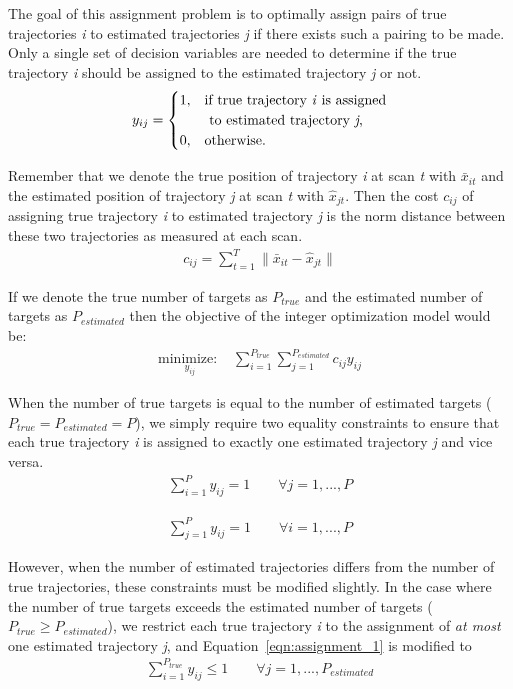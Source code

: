 \documentclass[journal]{IEEEtran}
\begin{document}
The goal of this assignment problem is to optimally assign pairs of true trajectories \textit{i} to estimated trajectories \textit{j} if there exists such a pairing to be made. Only a single set of decision variables are needed to determine if the true trajectory \textit{i} should be assigned to the estimated trajectory \textit{j} or not. 
\[y_{ij} = 
\begin{cases}
1, & \text{if true trajectory \textit{i} is assigned}\\
    & \text{ to estimated trajectory \textit{j},}\\
0, & \text{otherwise.}
\end{cases}\]

Remember that we denote the true position of trajectory \textit{i} at scan \textit{t} with $\bar{x}_{it}$ and the estimated position of trajectory \textit{j} at scan \textit{t} with $\hat{x}_{jt}$. Then the cost $c_{ij}$ of assigning true trajectory \textit{i} to estimated trajectory \textit{j} is the norm distance between these two trajectories as measured at each scan. 
\begin{align}
	c_{ij} = \sum_{t=1}^{T} \|\bar{x}_{it} - \hat{x}_{jt}\|
\end{align}

If we denote the true number of targets as $P_{true}$ and the estimated number of targets as $P_{estimated}$ then the objective of the integer optimization model would be:
\begin{align}
\underset{y_{ij}}{\text{minimize: }} & \sum_{i=1}^{P_{true}} \sum_{j=1}^{P_{estimated}} c_{ij}y_{ij}
\end{align}

When the number of true targets is equal to the number of estimated targets ($P_{true} = P_{estimated} = P$), we simply require two equality constraints to ensure that each true trajectory \textit{i} is assigned to exactly one estimated trajectory \textit{j} and vice versa. 
\begin{align}\label{eqn:assignment_1}
\sum_{i=1}^{P} y_{ij} = 1 \qquad \forall j = 1,...,P
\end{align}

\begin{align}\label{eqn:assignment_2}
\sum_{j=1}^{P} y_{ij} = 1 \qquad \forall i = 1,...,P
\end{align}

However, when the number of estimated trajectories differs from the number of true trajectories, these constraints must be modified slightly. In the case where the number of true targets exceeds the estimated number of targets ($P_{true}\geq P_{estimated}$), we restrict each true trajectory \textit{i} to the assignment of \textit{at most} one estimated trajectory \textit{j}, and Equation~\ref{eqn:assignment_1} is modified to
\begin{align}
\sum_{i=1}^{P_{true}} y_{ij} \leq 1 \qquad \forall  j = 1,...,P_{estimated}
\end{align}
\end{document}
